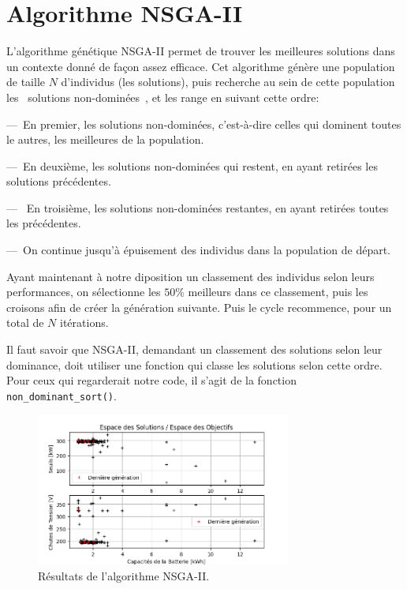 \documentclass[11pt, a4paper, oneside, portrait]{report}
\begin{document}
    \section*{Algorithme NSGA-II}
        L'algorithme génétique NSGA-II permet de trouver les meilleures solutions dans un contexte donné de façon assez efficace.
        Cet algorithme génère une population de taille $N$ d'individus (les solutions), puis recherche au sein de cette population les \guillemotleft{}~solutions non-dominées~\guillemotright{}, et les range en suivant cette ordre:

        ---~En premier, les solutions non-dominées, c'est-à-dire celles qui dominent toutes le autres, les meilleures de la population.

        ---~En deuxième, les solutions non-dominées qui restent, en ayant retirées les solutions précédentes.

        ---~ En troisième, les solutions non-dominées restantes, en ayant retirées toutes les précédentes.

        ---~On continue jusqu'à épuisement des individus dans la population de départ.

        Ayant maintenant à notre diposition un classement des individus selon leurs performances, on sélectionne les $50\%{}$ meilleurs dans ce classement, puis les croisons afin de créer la génération suivante.
        Puis le cycle recommence, pour un total de $N$ itérations.

        Il faut savoir que NSGA-II, demandant un classement des solutions selon leur dominance, doit utiliser une fonction qui classe les solutions selon cette ordre. Pour ceux qui regarderait notre code, il s'agit de la fonction \texttt{non\_dominant\_sort()}.

        \begin{figure}[H]
            \centering
            \includegraphics[width=0.75\textwidth]{Figures/NSGA-II.png}
            \caption{Résultats de l'algorithme NSGA-II.}
            \label{fig:NSGA2}
        \end{figure}
\end{document}
